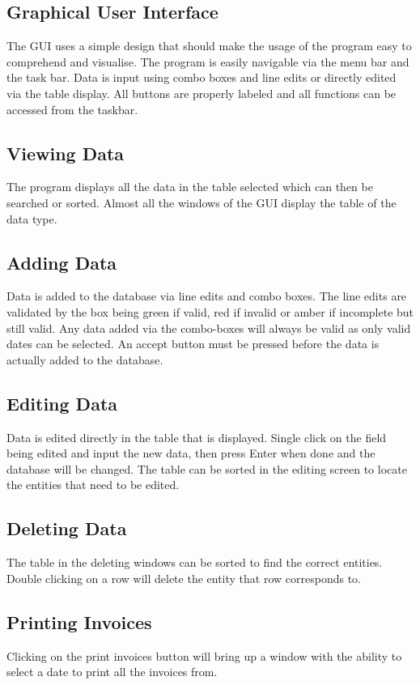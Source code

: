 \subsection{Graphical User Interface}
The GUI uses a simple design that should make the usage of the program easy to comprehend and visualise. The program is easily navigable via the menu bar and the task bar. Data is input using combo boxes and line edits or directly edited via the table display. All buttons are properly labeled and all functions can be accessed from the taskbar.

\subsection{Viewing Data}
The program displays all the data in the table selected which can then be searched or sorted. Almost all the windows of the GUI display the table of the data type.

\subsection{Adding Data}
Data is added to the database via line edits and combo boxes. The line edits are validated by the box being green if valid, red if invalid or amber if incomplete but still valid. Any data added via the combo-boxes will always be valid as only valid dates can be selected. An accept button must be pressed before the data is actually added to the database.

\subsection{Editing Data}
Data is edited directly in the table that is displayed. Single click on the field being edited and input the new data, then press Enter when done and the database will be changed. The table can be sorted in the editing screen to locate the entities that need to be edited.

\subsection{Deleting Data}
The table in the deleting windows can be sorted to find the correct entities. Double clicking on a row will delete the entity that row corresponds to.

\subsection{Printing Invoices}
Clicking on the print invoices button will bring up a window with the ability to select a date to print all the invoices from.


